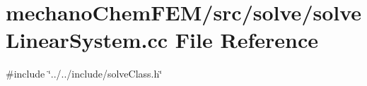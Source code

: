 \section{mechano\+Chem\+F\+E\+M/src/solve/solve\+Linear\+System.cc File Reference}
\label{solve_linear_system_8cc}
{\ttfamily \#include \char`\"{}../../include/solve\+Class.\+h\char`\"{}}\newline
